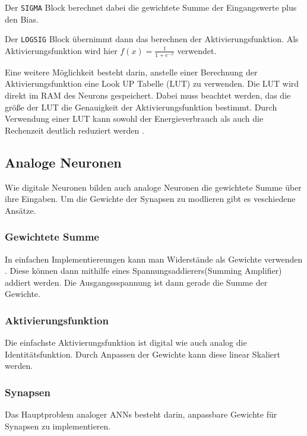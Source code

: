 \documentclass[conference]{IEEEtran}
\begin{document}
    Der \texttt{SIGMA} Block berechnet dabei die gewichtete Summe der Eingangswerte plus den Bias.

    Der \texttt{LOGSIG} Block übernimmt dann das berechnen der Aktivierungsfunktion.
    Als Aktivierungsfunktion wird hier $f(x) = \frac{1}{1+e^{-x}}$ verwendet.

    Eine weitere Möglichkeit besteht darin, anstelle einer Berechnung der Aktivierungsfunktion eine Look UP Tabelle (LUT) zu verwenden.
    Die LUT wird direkt im RAM des Neurons gespeichert.
    Dabei muss beachtet werden, das die größe der LUT die Genauigkeit der Aktivierungsfunktion bestimmt.
    Durch Verwendung einer LUT kann sowohl der Energieverbrauch als auch die Rechenzeit deutlich reduziert werden \cite{muthuramalingam2008neural} .


    \subsection{Analoge Neuronen}

    Wie digitale Neuronen bilden auch analoge Neuronen die gewichtete Summe über ihre Eingaben.
    Um die Gewichte der Synapsen zu modlieren gibt es veschiedene Ansätze.

    \subsubsection{Gewichtete Summe}
    In einfachen Implementiereungen kann man Widerstände als Gewichte verwenden \cite{zurada1992analog} .
    Diese können dann mithilfe eines Spannungsaddierers(Summing Amplifier) addiert werden.
    Die Ausgangssspannung ist dann gerade die Summe der Gewichte.


    \subsubsection{Aktivierungsfunktion}
    Die einfachste Aktivierungsfunktion ist digital wie auch analog die Identitätsfunktion.
    Durch Anpassen der Gewichte kann diese linear Skaliert werden. \cite{zurada1992analog}


    \subsubsection{Synapsen}
    Das Hauptproblem analoger ANNs besteht darin, anpassbare Gewichte für Synapsen zu implementieren.
\end{document}
